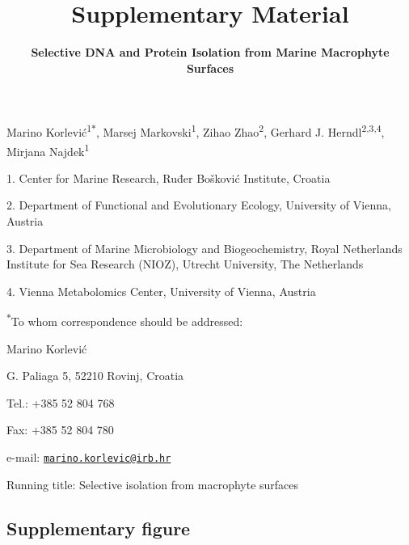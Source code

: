 \documentclass[12pt,]{article}
\title{\textbf{Supplementary Material}}
\subtitle{\textbf{Selective DNA and Protein Isolation from Marine Macrophyte
Surfaces}}
\author{}
\date{}
\begin{document}
\maketitle

\vspace{20mm}

Marino Korlević\textsuperscript{1\(*\)}, Marsej
Markovski\textsuperscript{1}, Zihao Zhao\textsuperscript{2}, Gerhard J.
Herndl\textsuperscript{2,3,4}, Mirjana Najdek\textsuperscript{1}

1. Center for Marine Research, Ruđer Bošković Institute, Croatia

2. Department of Functional and Evolutionary Ecology, University of
Vienna, Austria

3. Department of Marine Microbiology and Biogeochemistry, Royal
Netherlands Institute for Sea Research (NIOZ), Utrecht University, The
Netherlands

4. Vienna Metabolomics Center, University of Vienna, Austria

\textsuperscript{\(*\)}To whom correspondence should be addressed:

Marino Korlević

G. Paliaga 5, 52210 Rovinj, Croatia

Tel.: +385 52 804 768

Fax: +385 52 804 780

e-mail:
\href{mailto:marino.korlevic@irb.hr}{\nolinkurl{marino.korlevic@irb.hr}}

Running title: Selective isolation from macrophyte surfaces

\setlength\parindent{24pt}

\hypertarget{supplementary-figure}{%
\subsection{Supplementary figure}\label{supplementary-figure}}
\end{document}

